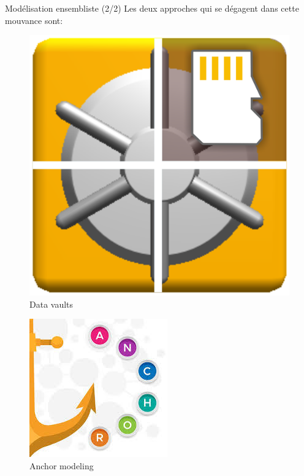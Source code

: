 \begin{frame}{Modélisation ensembliste (2/2)}
	Les deux approches qui se dégagent dans cette mouvance sont:
	\begin{minipage}{0.4\linewidth}
	   \hspace{10cm}
       \begin{figure}
            \includegraphics[scale=0.2]{figures/vault.png}
            \caption{Data vaults}
		\end{figure}
	\end{minipage}
	\hspace{1cm}
    \begin{minipage}{0.4\linewidth}	
    \hspace{10cm}
        \begin{figure}
            \includegraphics[scale=0.33]{figures/anchor.jpg}
            \caption{Anchor modeling}
		\end{figure}
    \end{minipage}
\end{frame}
